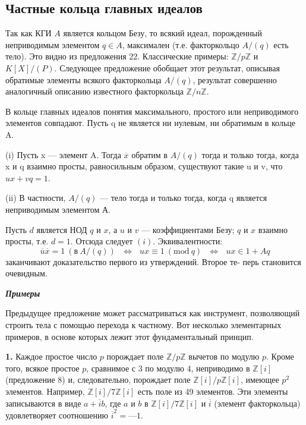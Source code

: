\documentclass{mai_book}
\begin{document}
\subsection{Частные кольца главных идеалов}
Так как КГИ $A$ является кольцом Безу, то всякий идеал,  
порожденный неприводимым элементом $q \in A$, максимален (т.е. факторкольцо 
$A\slash(q)$ есть тело). Это видно из предложения 22. Классические примеры: 
$\mathbb{Z}\slash p\mathbb{Z}$ и $K[X]\slash(P)$. Следующее предложение обобщает этот результат, 
описывая обратимые элементы всякого факторкольца $A\slash(q)$, результат 
совершенно аналогичный описанию известного факторкольца $\mathbb{Z}\slash n\mathbb{Z}$. 
\begin{predl}

В кольце главных идеалов понятия максимального, простого или 
неприводимого элементов совпадают. Пусть q не является ни нулевым, 
ни обратимым в кольце A. 

(i) Пусть x — элемент A. Тогда $\overline{x}$ обратим в $A\slash(q)$ тогда и только 
тогда, когда x и q взаимно просты, равносильным образом, существуют 
такие u и v, что $ux + vq = 1$. 

(ii) В частности, $A\slash(q)$ — тело тогда и только тогда, когда q  
является неприводимым элементом А. 
\end{predl}
\begin{myproof}
Пусть $d$ является НОД $q$ и $x$, а $u$ и $v$ — коэффициентами Безу; $q$ и $x$ 
взаимно просты, т.е. $d = 1$. Отсюда следует $(i)$. Эквивалентности: 
\begin{equation*}
\overline{u}\overline{x} = 1\: (\text{в}\: A\slash (q))\:\:\: \Leftrightarrow\:\:\: ux \equiv 1\: (\text{mod}\:q)\:\:\: \Leftrightarrow \:\:\: ux \in 1 + Aq
\end{equation*}
заканчивают доказательство первого из утверждений. Второе те- 
перь становится очевидным. 
\end{myproof}

\noindent\textbf{\textit{Примеры}}

Предыдущее предложение может рассматриваться как инструмент, 
позволяющий строить тела с помощью перехода к частному. Вот  
несколько элементарных примеров, в основе которых лежит этот  
фундаментальный принцип. 
\newpage

\textbf{1.} Каждое простое число $p$ порождает поле $\mathbb{Z}\slash p\mathbb{Z}$ вычетов по  
модулю $p$. Кроме того, всякое простое $p$, сравнимое с 3 по модулю 4, 
неприводимо в $\mathbb{Z}[i]$ (предложение 8) и, следовательно, порождает поле 
$\mathbb{Z}[i]\slash p\mathbb{Z}[i]$, имеющее $p^2$ элементов. Например, $\mathbb{Z}[i]\slash 7\mathbb{Z}[i]$ есть поле из 49 
элементов. Эти элементы записываются в виде $a+\overline{i}b$, где $a$ и $b$ в $\mathbb{Z}[i]\slash 7\mathbb{Z}[i]$
и $\overline{i}$ (элемент факторкольца) удовлетворяет соотношению $\overline{i}^2 = — 1.$
\end{document}
